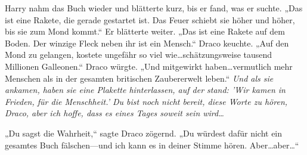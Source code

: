 Harry nahm das Buch wieder und blätterte kurz, bis er fand, was er suchte. „Das ist eine Rakete, die gerade gestartet ist. Das Feuer schiebt sie höher und höher, bis sie zum Mond kommt.“ Er blätterte weiter. „Das ist eine Rakete auf dem Boden. Der winzige Fleck neben ihr ist ein Mensch.“ Draco keuchte. „Auf den Mond zu gelangen, kostete ungefähr so viel wie…schätzungsweise tausend Millionen Galleonen.“ Draco würgte. „Und mitgewirkt haben…vermutlich mehr Menschen als in der gesamten britischen Zaubererwelt leben.“ \emph{Und als sie ankamen, haben sie eine Plakette hinterlassen, auf der stand: 'Wir kamen in Frieden, für die Menschheit.' Du bist noch nicht bereit, diese Worte zu hören, Draco, aber ich hoffe, dass es eines Tages soweit sein wird…}

„Du sagst die Wahrheit,“ sagte Draco zögernd. „Du würdest dafür nicht ein gesamtes Buch fälschen—und ich kann es in deiner Stimme hören. Aber…aber…“

